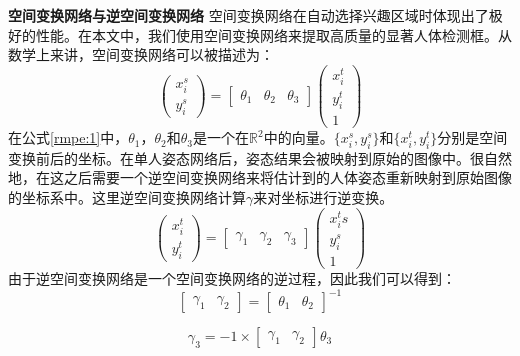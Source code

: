 \textbf{空间变换网络与逆空间变换网络} 空间变换网络在自动选择兴趣区域时体现出了极好的性能。在本文中，我们使用空间变换网络来提取高质量的显著人体检测框。从数学上来讲，空间变换网络可以被描述为：
\begin{equation}
\label{rmpe:1}
\begin{pmatrix}
x_i^s \\
y_i^s
\end{pmatrix}
= 
\begin{bmatrix}
\theta_1 & \theta_2 & \theta_3
\end{bmatrix}
\begin{pmatrix}
x_i^t \\
y_i^t \\
1
\end{pmatrix}
\end{equation}
在公式\eqref{rmpe:1}中，$\theta_1$，$\theta_2$和$\theta_3$是一个在$\mathbb{R}^2$中的向量。$\{x_i^s, y_i^s\}$和$\{x_i^t,y_i^t\}$分别是空间变换前后的坐标。在单人姿态网络后，姿态结果会被映射到原始的图像中。很自然地，在这之后需要一个逆空间变换网络来将估计到的人体姿态重新映射到原始图像的坐标系中。这里逆空间变换网络计算$\gamma$来对坐标进行逆变换。
\begin{equation}
\label{rmpe:2}
\begin{pmatrix}
x_i^t \\
y_i^t
\end{pmatrix}
= 
\begin{bmatrix}
\gamma_1 & \gamma_2 & \gamma_3
\end{bmatrix}
\begin{pmatrix}
x_i^ts\\
y_i^s\\
1
\end{pmatrix}
\end{equation}
由于逆空间变换网络是一个空间变换网络的逆过程，因此我们可以得到：
\begin{equation}
\label{rmpe:3}
\begin{bmatrix}
\gamma_1 & \gamma_2
\end{bmatrix}
=
\begin{bmatrix}
\theta_1 & \theta_2
\end{bmatrix}^{-1}
\end{equation}

\begin{equation}
\label{rmpe:4}
\gamma_3 = -1 \times 
\begin{bmatrix}
\gamma_1 & \gamma_2
\end{bmatrix}
\theta_3
\end{equation}

